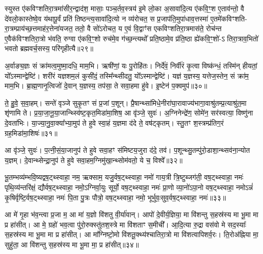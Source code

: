 स्युस्त ए॑कविꣳशतिरा॒त्रमा॑सीर॒न्द्वाद॑श॒ मासाः॒ पञ्च॒र्तव॒स्त्रय॑ इ॒मे लो॒का अ॒सावा॑दि॒त्य ए॑कवि॒ꣳ॒श ए॒ताव॑न्तो॒ वै दे॑वलो॒कास्तेष्वे॒व य॑थापू॒र्वं प्रति॑ तिष्ठन्त्य॒सावा॑दि॒त्यो न व्य॑रोचत॒ स प्र॒जाप॑ति॒मुपा॑धाव॒त्तस्मा॑ ए॒तमे॑कविꣳशति- रा॒त्रम्प्राय॑च्छ॒त्तमाह॑र॒त्तेना॑यजत॒ ततो॒ वै सो॑\-ऽरोचत॒ य ए॒वं वि॒द्वाꣳ॑स एकविꣳशतिरा॒त्रमास॑ते॒ रोच॑न्त ए॒वैक॑विꣳशतिरा॒त्रो भ॑वति॒ रुग्वा ए॑कवि॒ꣳ॒शो रुच॑मे॒व ग॑च्छ॒न्त्यथो᳚ प्रति॒ष्ठामे॒व प्र॑ति॒ष्ठा ह्ये॑कवि॒ꣳ॒शो॑-\-ऽ तिरा॒त्राव॒भितो॑ भवतो ब्रह्मवर्च॒सस्य॒ परि॑गृहीत्यै॥२९॥

{\anuvakamend[{गृ॒ह्ण॒न्ति॒ दि॒वा॒की॒र्त्ये॑नै॒वोभ॒यतो॒ नाप्र॑तिष्ठिता॒ आस॑त॒ एक॑विꣳशतिश्च॥10॥}]}

अ॒र्वाङ्य॒ज्ञः सं क्रा॑मत्व॒मुष्मा॒दधि॒ माम॒भि। ऋषी॑णां॒ यः पु॒रोहि॑तः। निर्दे॑वं॒ निर्वी॑रं कृ॒त्वा विष्क॑न्धं॒ तस्मि॑न् हीयतां॒ यो᳚\-ऽस्मान्द्वेष्टि॑। शरी॑रं यज्ञशम॒लं कुसी॑दं॒ तस्मि᳚न्थ्सीदतु॒ यो᳚\-ऽस्मान्द्वेष्टि॑। यज्ञ॑ य॒ज्ञस्य॒ यत्तेज॒स्तेन॒ सं क्रा॑म॒ माम॒भि। ब्रा॒ह्म॒णानृ॒त्विजो॑ दे॒वान् य॒ज्ञस्य॒ तप॑सा॒ ते सवा॒हमा हु॑वे। इ॒ष्टेन॑ प॒क्वमुप॑॥३०॥

ते॒ हु॒वे॒ स॒वा॒हम्। सन्ते॑ वृञ्जे सुकृ॒तꣳ सं प्र॒जां प॒शून्। प्रै॒षान्थ्सा॑मिधे॒नीरा॑घा॒रावाज्य॑भागा॒वाश्रु॑तम्प्र॒त्याश्रु॑त॒मा शृ॑णामि ते। प्र॒या॒जा॒नू॒या॒जान्थ्स्वि॑ष्ट॒कृत॒मिडा॑मा॒शिष॒ आ वृ॑ञ्जे॒ सुवः॑। अ॒ग्निनेन्द्रे॑ण॒ सोमे॑न॒ सर॑स्वत्या॒ विष्णु॑ना दे॒वता॑भिः। या॒ज्या॒नु॒वा॒क्या᳚भ्या॒मुप॑ ते हुवे स्वा॒हं य॒ज्ञमा द॑दे ते॒ वष॑ट्कृतम्। स्तु॒तꣳ श॒स्त्रम्प्र॑तिग॒रं ग्रह॒मिडा॑मा॒शिषः॑॥३१॥

आ वृ॑ञ्जे॒ सुवः॑। प॒त्नी॒सं॒या॒जानुप॑ ते हुवे सवा॒हꣳ स॑मिष्टय॒जुरा द॑दे॒ तव॑। प॒शून्थ्सु॒तम्पु॑रो॒डाशा॒न्थ्सव॑ना॒न्योत य॒ज्ञम्। दे॒वान्थ्सेन्द्रा॒नुप॑ ते हुवे सवा॒हम॒ग्निमु॑खा॒न्थ्सोम॑वतो॒ ये च॒ विश्वे᳚॥३२॥

{\anuvakamend[{उप॒ ग्रह॒मिडा॑मा॒शिषो॒ द्वात्रिꣳ॑शच्च॥11॥}]}

भू॒तम्भव्य॑म्भवि॒ष्यद्वष॒ट्थ्स्वाहा॒ नम॒ ऋक्साम॒ यजु॒र्वष॒ट्थ्स्वाहा॒ नमो॑ गाय॒त्री त्रि॒ष्टुब्जग॑ती॒ वष॒ट्थ्स्वाहा॒ नमः॑ पृथि॒व्य॑न्तरि॑क्षं॒ द्यौर्वष॒ट्थ्स्वाहा॒ नमो॒\-ऽग्निर्वा॒युः सूर्यो॒ वष॒ट्थ्स्वाहा॒ नमः॑ प्रा॒णो व्या॒नो॑\-ऽपा॒नो वष॒ट्थ्स्वाहा॒ नमो\-ऽन्नं॑ कृ॒षिर्वृष्टि॒र्वष॒ट्थ्स्वाहा॒ नमः॑ पि॒ता पु॒त्रः पौत्रो॒ वष॒ट्थ्स्वाहा॒ नमो॒ भूर्भुवः॒सुव॒र्वष॒ट्थ्स्वाहा॒ नमः॑॥३३॥

{\anuvakamend[{भुव॑श्च॒त्वारि॑ च॥12॥}]}

आ मे॑ गृ॒हा भ॑व॒न्त्वा प्र॒जा म॒ आ मा॑ य॒ज्ञो वि॑शतु वी॒र्या॑वान्। आपो॑ दे॒वीर्य॒ज्ञिया॒ मा वि॑शन्तु स॒हस्र॑स्य मा भू॒मा मा प्र हा॑सीत्। आ मे॒ ग्रहो॑ भव॒त्वा पु॑रो॒रुक्स्तु॑तश॒स्त्रे मा वि॑शताꣳ स॒मीची᳚। आ॒दि॒त्या रु॒द्रा वस॑वो मे सद॒स्याः᳚ स॒हस्र॑स्य मा भू॒मा मा प्र हा॑सीत्। आ मा᳚ग्निष्टो॒मो वि॑शतू॒क्थ्य॑श्चातिरा॒त्रो मा वि॑शत्वापिशर्व॒रः। ति॒रोअ॑ह्निया मा॒ सुहु॑ता॒ आ वि॑शन्तु स॒हस्र॑स्य मा भू॒मा मा॒ प्र हा॑सीत्॥३४॥

